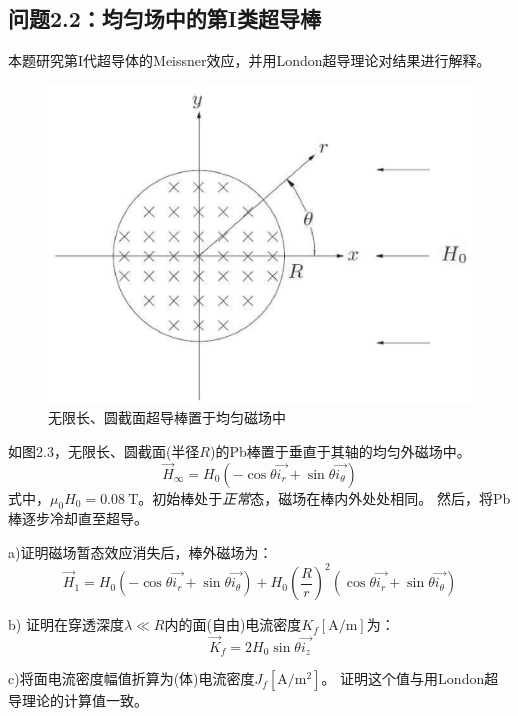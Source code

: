 \subsection{问题2.2：均匀场中的第I类超导棒}
本题研究第I代超导体的Meissner效应，并用London超导理论对结果进行解释。

\begin{figure}[htbp]
	\centering
	\includegraphics[scale=0.4]{chpt2/figs/fig2.3.eps}
	\caption{无限长、圆截面超导棒置于均匀磁场中}
\end{figure}

如图2.3，无限长、圆截面(半径$R$)的Pb棒置于垂直于其轴的均匀外磁场中。
\begin{equation*}\label{eqn:2.40}
  \vec{H}_\infty = H_0 (-\cos \theta\vec{i_r}+\sin\theta\vec{i_\theta}) \tag{2.40}
\end{equation*}
式中，$\mu_0H_0=0.08\ \mathrm{T}$。初始棒处于\textit{正常}态，磁场在棒内外处处相同。
然后，将Pb棒逐步冷却直至超导。

a)证明磁场暂态效应消失后，棒外磁场为：
\begin{equation}
  \vec{H}_1=H_0(-\cos\theta\vec{i_r}+\sin\theta\vec{i_\theta})+H_0\left(\frac{R}{r}\right)^2 (\cos\theta\vec{i_r}+\sin\theta\vec{i_\theta})
\end{equation}

b) 证明在穿透深度$\lambda\ll R$内的面(自由)电流密度$K_f [\mathrm{A/m}]$为：
\begin{equation}
  \vec{K}_f=2H_0 \sin\theta\vec{i_z}
\end{equation}

c)将面电流密度幅值折算为(体)电流密度$J_f [\mathrm{A/m^2}]$。
证明这个值与用London超导理论的计算值一致。

